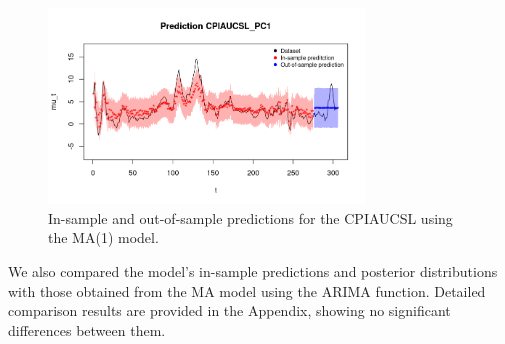 \begin{figure}[H]
    \centering
    \includegraphics[width=0.75\textwidth]{images/3-MA/infl_prediction.png}
    \caption{In-sample and out-of-sample predictions for the CPIAUCSL using the MA(1) model.}
    \label{fig:MA1_infl_prediction}
\end{figure}
We also compared the model's in-sample predictions and posterior distributions with those obtained from the MA model using the ARIMA function. Detailed comparison results are provided in the Appendix, showing no significant differences between them.
